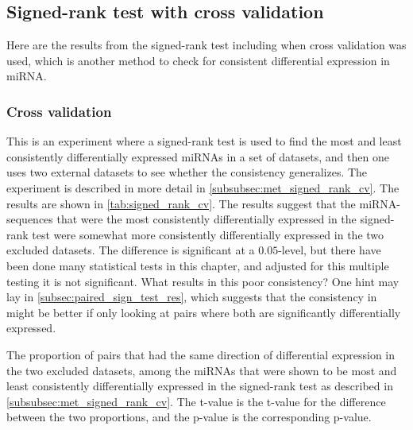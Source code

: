 {{{\subsection{Signed-rank test with cross validation}
Here are the results from the signed-rank test including when cross validation was used, which is another method to check for consistent differential expression in miRNA.

\subsubsection{Cross validation}
\label{subsubec:signed_rank_cv_res}

This is an experiment where a signed-rank test is used to find the most and least consistently differentially expressed miRNAs in a set of datasets, and then one uses two external datasets to see whether the consistency generalizes. The experiment is described in more detail in \autoref{subsubsec:met_signed_rank_cv}. The results are shown in \autoref{tab:signed_rank_cv}. The results suggest that the miRNA-sequences that were the most consistently differentially expressed in the signed-rank test were somewhat more consistently differentially expressed in the two excluded datasets. The difference is significant at a $0.05$-level, but there have been done many statistical tests in this chapter, and adjusted for this multiple testing it is not significant. What results in this poor consistency? One hint may lay in \autoref{subsec:paired_sign_test_res}, which suggests that the consistency in might be better if only looking at pairs where both are significantly differentially expressed.

\begin{table}
    \caption{The proportion of pairs that had the same direction of differential expression in the two excluded datasets, among the miRNAs that were shown to be most and least consistently differentially expressed in the signed-rank test as described in \autoref{subsubsec:met_signed_rank_cv}. The t-value is the t-value for the difference between the two proportions, and the p-value is the corresponding p-value.}
    \label{tab:signed_rank_cv}
    \begin{center}
    \end{center}
\end{table}

}}}
